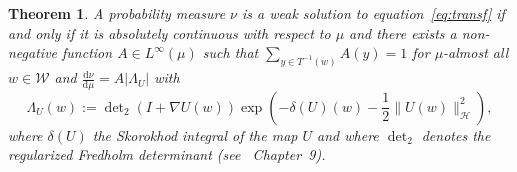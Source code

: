 \documentclass[a4paper,10pt]{article}
\newcommand{\assign}{:=}
\newcommand{\mathd}{\mathrm{d}}
\newtheorem{theorem}{Theorem}
\begin{document}
\begin{theorem}
  \label{theorem_weaksolution}A probability measure $\nu$ is a weak solution
  to equation~{\eqref{eq:transf}} if and only if it is absolutely continuous
  with respect to $\mu$ and there exists a non-negative function $A \in
  L^{\infty} (\mu)$ such that $\sum_{y \in T^{- 1} (w)} A (y) = 1$ for
  $\mu$-almost all $w \in \mathcal{W}$ and $\frac{\mathd \nu}{\mathd \mu} = A
  | \Lambda_U |$ with
  \[ \Lambda_U (w) \assign \det\nolimits_2 (I + \nabla U (w)) \exp \left( - \delta (U)
     (w) - \frac{1}{2} \|U (w) \|_{\mathcal{H}}^2 \right), \]
  where $\delta (U)$ the Skorokhod integral of the map $U$ and where $\det\nolimits_2$
  denotes the regularized Fredholm determinant (see~{\cite{Simon2005}}
  Chapter~9).
\end{theorem}
\end{document}
